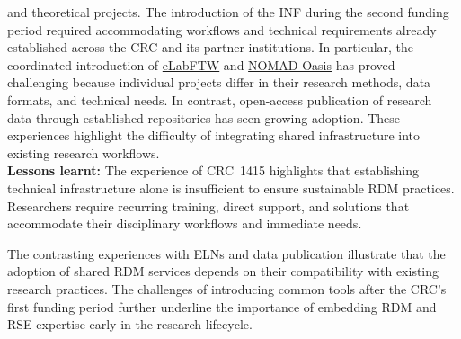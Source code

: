 \documentclass{eceasst}
\begin{document}
and theoretical projects. The introduction of the INF during
the second funding period required accommodating workflows
and technical requirements already established across the
CRC and its partner institutions.
In particular, the coordinated introduction of \href{https://www.elabftw.net/}{eLabFTW} and
\href{https://nomad-lab.eu/nomad-lab/nomad-oasis.html}
{NOMAD Oasis} has proved challenging because individual projects
differ in their research methods, data formats, and technical
needs. In contrast, open-access publication of research data
through established repositories has seen growing adoption.
These experiences highlight the difficulty of integrating
shared infrastructure into existing research workflows.
\\
\noindent\textbf{Lessons learnt:}
The experience of CRC~1415 highlights that establishing
technical infrastructure alone is insufficient to ensure
sustainable RDM practices. Researchers require recurring
training, direct support, and solutions that accommodate
their disciplinary workflows and immediate needs.

The contrasting experiences with ELNs and data
publication illustrate that the adoption of shared
RDM services depends on their compatibility with
existing research practices. The challenges of
introducing common tools after the CRC's first funding
period further underline the importance of embedding
RDM and RSE expertise early in the research lifecycle.

\end{document}
